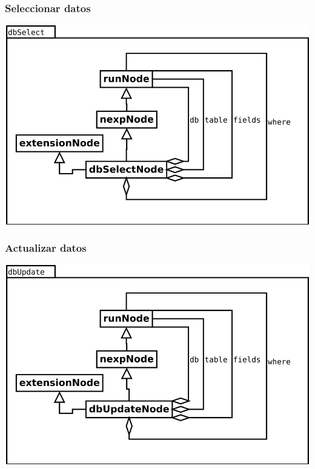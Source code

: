 \subsubsection {Seleccionar datos}
\begin{center}
\includegraphics[scale=0.4]{dbSelect.png} \\
\end{center}

\subsubsection {Actualizar datos}
\begin{center}
\includegraphics[scale=0.4]{dbUpdate.png} \\
\end{center}

